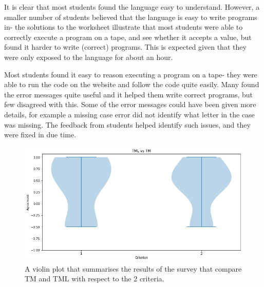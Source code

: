 It is clear that most students found the language easy to understand. However, a smaller number of students believed that the language is easy to write programs in- the solutions to the worksheet illustrate that most students were able to correctly execute a program on a tape, and see whether it accepts a value, but found it harder to write (correct) programs. This is expected given that they were only exposed to the language for about an hour.


Most students found it easy to reason executing a program on a tape- they were able to run the code on the website and follow the code quite easily. Many found the error messages quite useful and it helped them write correct programs, but few disagreed with this. Some of the error messages could have been given more details, for example a missing case error did not identify what letter in the case was missing. 
The feedback from students helped identify such issues, and they were fixed in due time. 

\begin{figure}
    \centering
    \includegraphics[scale=0.35]{data/tml-v-tm.png}
    \caption{A violin plot that summarises the results of the survey that compare TM and TML with respect to the 2 criteria.}
    \label{fig:tml-v-tm}
\end{figure}

